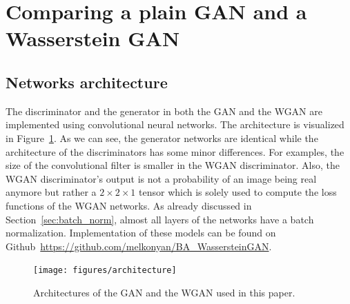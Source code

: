 \section{Comparing a plain GAN and a Wasserstein GAN}

\subsection{Networks architecture}
	The discriminator and the generator in both the GAN and the WGAN are implemented using convolutional neural networks. The architecture is visualized in Figure~\ref{fig:gan_arc}. As we can see, the generator networks are identical while the architecture of the discriminators has some minor differences. For examples, the size of the convolutional filter is smaller in the WGAN discriminator. Also, the WGAN discriminator's output is not a probability of an image being real anymore but rather a $2 \times 2 \times 1 $ tensor which is solely used to compute the loss functions of the WGAN networks. As already discussed in Section~\ref{sec:batch_norm}, almost all layers of the networks have a batch normalization. Implementation of these models can be found on Github~\url{https://github.com/melkonyan/BA_WassersteinGAN}. 
\begin{figure}[h]
	\texttt{[image: figures/architecture]}
	\caption{Architectures of the GAN and the WGAN used in this paper.}
	\label{fig:gan_arc}
\end{figure}
